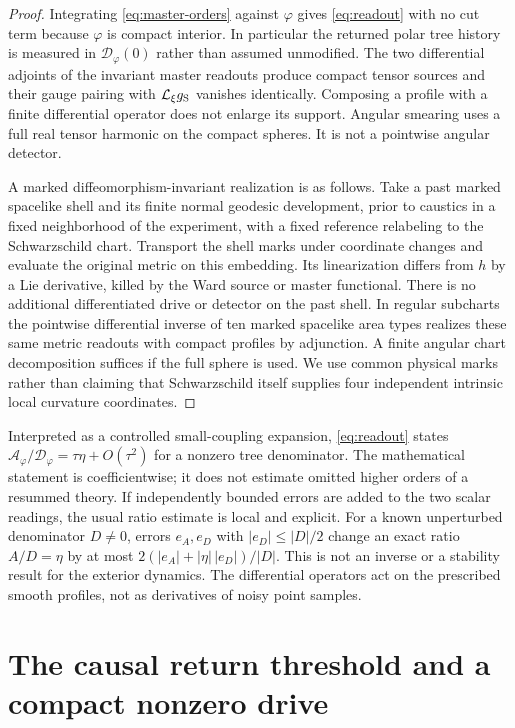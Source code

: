 \documentclass[11pt]{article}
\newcommand{\Lie}{\mathcal L}
\newcommand{\Sch}{g_{\rm S}}
\begin{document}
\begin{proof}
Integrating \eqref{eq:master-orders} against $\varphi$ gives \eqref{eq:readout} with no cut term because $\varphi$ is compact interior. In particular the returned polar tree history is measured in $\mathcal D_\varphi(0)$ rather than assumed unmodified. The two differential adjoints of the invariant master readouts produce compact tensor sources and their gauge pairing with $\Lie_\xi\Sch$ vanishes identically. Composing a profile with a finite differential operator does not enlarge its support. Angular smearing uses a full real tensor harmonic on the compact spheres. It is not a pointwise angular detector.

A marked diffeomorphism-invariant realization is as follows. Take a past marked spacelike shell and its finite normal geodesic development, prior to caustics in a fixed neighborhood of the experiment, with a fixed reference relabeling to the Schwarzschild chart. Transport the shell marks under coordinate changes and evaluate the original metric on this embedding. Its linearization differs from $h$ by a Lie derivative, killed by the Ward source or master functional. There is no additional differentiated drive or detector on the past shell. In regular subcharts the pointwise differential inverse of ten marked spacelike area types \cite{P46} realizes these same metric readouts with compact profiles by adjunction. A finite angular chart decomposition suffices if the full sphere is used. We use common physical marks rather than claiming that Schwarzschild itself supplies four independent intrinsic local curvature coordinates.
\end{proof}

Interpreted as a controlled small-coupling expansion, \eqref{eq:readout} states $\mathcal A_\varphi/\mathcal D_\varphi=\tau\eta+O(\tau^2)$ for a nonzero tree denominator. The mathematical statement is coefficientwise; it does not estimate omitted higher orders of a resummed theory. If independently bounded errors are added to the two scalar readings, the usual ratio estimate is local and explicit. For a known unperturbed denominator $D\ne0$, errors $e_A,e_D$ with $|e_D|\le |D|/2$ change an exact ratio $A/D=\eta$ by at most $2(|e_A|+|\eta|\,|e_D|)/|D|$. This is not an inverse or a stability result for the exterior dynamics. The differential operators act on the prescribed smooth profiles, not as derivatives of noisy point samples.

\section{The causal return threshold and a compact nonzero drive}\label{sec:shield}
\end{document}
